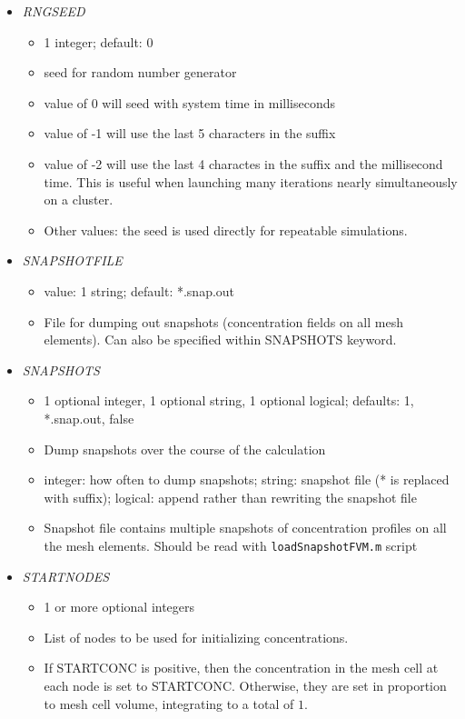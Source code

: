 \documentclass[12pt]{article}
\begin{document}
\begin{itemize}
\item {\it RNGSEED}
  \begin{itemize}
    \item 1 integer; default: 0
    \item seed for random number generator
    \item value of 0 will seed with system time in milliseconds
    \item value of -1 will use the last 5 characters in the suffix
    \item value of -2 will use the last 4 charactes in the suffix and the millisecond time. This is useful when launching many iterations nearly simultaneously on a cluster.
    \item Other values: the seed is used directly for repeatable simulations. 
  \end{itemize}
%
\item {\it SNAPSHOTFILE}
    \begin{itemize}
      \item  value: 1 string; default: *.snap.out
      \item File for dumping out snapshots (concentration fields on all mesh elements). Can also be specified within SNAPSHOTS keyword.
    \end{itemize}
%
\item {\it SNAPSHOTS}
\begin{itemize}
	\item 1 optional integer, 1 optional string, 1 optional logical; defaults: 1, *.snap.out, false
	\item Dump snapshots over the course of the calculation
	\item integer: how often to dump snapshots; string: snapshot file (* is replaced with suffix); logical: append rather than rewriting the snapshot file
	\item Snapshot file contains multiple snapshots of concentration profiles on all the mesh elements. Should be read with \verb=loadSnapshotFVM.m= script
\end{itemize}
%
\item {\it STARTNODES}
\begin{itemize}
	\item 1 or more optional integers
	\item List of nodes to be used for initializing concentrations.
	\item If STARTCONC is positive, then the concentration in the mesh cell at each node is set to STARTCONC. Otherwise, they are set in proportion to mesh cell volume, integrating to a total of $1$.

\end{itemize}
\end{itemize}
\end{document}
